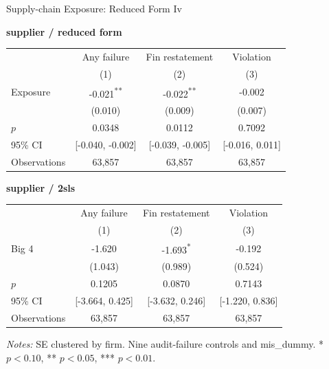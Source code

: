 \documentclass[10pt]{article}
\newcommand{\sym}[1]{\textsuperscript{#1}}
\begin{document}
\fontsize{10}{12}\selectfont
\setlength{\tabcolsep}{3pt}\renewcommand{\arraystretch}{1.15}
\begin{center}\large Supply-chain Exposure: Reduced Form Iv\end{center}
\medskip\textbf{supplier / reduced form}\par\smallskip
\begin{tabular*}{\textwidth}{@{\extracolsep{\fill}}lccc@{}}
\toprule
 & Any failure & Fin restatement & Violation \\
 & (1) & (2) & (3) \\
\midrule
Exposure & -0.021\sym{**} & -0.022\sym{**} & -0.002 \\
 & (0.010) & (0.009) & (0.007) \\
$p$ & 0.0348 & 0.0112 & 0.7092 \\
95\% CI & [-0.040, -0.002] & [-0.039, -0.005] & [-0.016, 0.011] \\
Observations & 63,857 & 63,857 & 63,857 \\
\bottomrule\end{tabular*}\par
\medskip\textbf{supplier / 2sls}\par\smallskip
\begin{tabular*}{\textwidth}{@{\extracolsep{\fill}}lccc@{}}
\toprule
 & Any failure & Fin restatement & Violation \\
 & (1) & (2) & (3) \\
\midrule
Big 4 & -1.620 & -1.693\sym{*} & -0.192 \\
 & (1.043) & (0.989) & (0.524) \\
$p$ & 0.1205 & 0.0870 & 0.7143 \\
95\% CI & [-3.664, 0.425] & [-3.632, 0.246] & [-1.220, 0.836] \\
Observations & 63,857 & 63,857 & 63,857 \\
\bottomrule\end{tabular*}\par
\medskip\fontsize{9}{11}\selectfont\textit{Notes:} SE clustered by firm. Nine audit-failure controls and mis\_dummy. * $p<0.10$, ** $p<0.05$, *** $p<0.01$.
\end{document}
